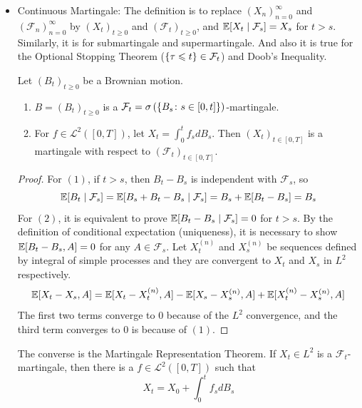 \documentclass[a4paper,12pt]{article}
\begin{document}
\begin{itemize}
  \item Continuous Martingale: The definition is to replace $(X_n)_{n=0}^{\infty}$ and $(\mathcal{F}_n)_{n=0}^{\infty}$ by $(X_t)_{t \geqslant 0}$ and $(\mathcal{F}_t)_{t\geqslant 0}$, and $\mathbb{E}[X_t \mid \mathcal{F}_s] = X_s$ for $t > s$. Similarly, it is for submartingale and supermartingale. And also it is true for the Optional Stopping Theorem ($\left\{\tau \leqslant t\right\} \in \mathcal{F}_t$) and Doob's Inequality.
  \begin{thm}
    Let $(B_t)_{t\geqslant 0}$ be a Brownian motion.
    \begin{enumerate}[label=(\arabic*)]
      \item $B=(B_t)_{t\geqslant 0}$ is a $\mathcal{F}_t=\sigma\left(\left\{B_s \colon s \in [0,t]\right\}\right)$-martingale.
      \item For $f \in \mathcal{L}^2([0,T])$, let $X_t = \int_0^tf_sdB_s$. Then $(X_t)_{t \in [0,T]}$ is a martingale with respect to $(\mathcal{F}_t)_{t\in [0,T]}$.
    \end{enumerate}
  \end{thm}
  \begin{proof}
    For $(1)$, if $t > s$, then $B_t-B_s$ is independent with $\mathcal{F}_s$, so
    \begin{equation*}
      \mathbb{E}[B_t \mid \mathcal{F}_s] = \mathbb{E}[B_s + B_t - B_s \mid \mathcal{F}_s] = B_s + \mathbb{E}[B_t - B_s] = B_s
    \end{equation*}
    For $(2)$, it is equivalent to prove $\mathbb{E}[B_t-B_s \mid \mathcal{F}_s] = 0$ for $t>s$. By the definition of conditional expectation (uniqueness), it is necessary to show $\mathbb{E}[B_t-B_s, A] = 0$ for any $A \in \mathcal{F}_s$. Let $X_t^{(n)}$ and $X_s^{(n)}$ be sequences defined by integral of simple processes and they are convergent to $X_t$ and $X_s$ in $L^2$ respectively.
    \begin{equation*}
      \mathbb{E}[X_t-X_s, A] = \mathbb{E}[X_t-X^{(n)}_t, A] - \mathbb{E}[X_s-X^{(n)}_s, A] + \mathbb{E}[X^{(n)}_t-X^{(n)}_s, A]
    \end{equation*}
    The first two terms converge to $0$ because of the $L^2$ convergence, and the third term converges to $0$ is because of $(1)$.
  \end{proof}
  \begin{rmk}
    The converse is the Martingale Representation Theorem. If $X_t \in L^2$ is a $\mathcal{F}_t$-martingale, then there is a $f \in \mathcal{L}^2([0,T])$ such that
    \begin{equation*}
      X_t = X_0 + \int_0^t f_sdB_s
    \end{equation*}
  \end{rmk}


\end{itemize}
\end{document}
